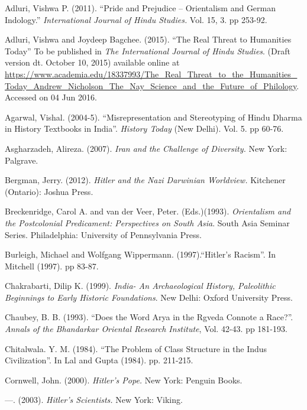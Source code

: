 \begin{thebibliography}{99}
\itemsep=1pt
 Adluri, Vishwa P. (2011). “Pride and Prejudice – Orientalism and German Indology.” \textit{International Journal of Hindu Studies.} Vol. 15, 3. pp 253-92.

  Adluri, Vishwa and Joydeep Bagchee. (2015). “The Real Threat to Humanities Today” To be published in \textit{The International Journal of Hindu Studies}. (Draft version dt. October 10, 2015) available online at \url{https://www.academia.edu/18337993/The_Real_Threat_to_the_Humanities_Today_Andrew_Nicholson_The_Nay_Science_and_the_Future_of_Philology}. Accessed on 04 Jun 2016.

  Agarwal, Vishal. (2004-5). “Misrepresentation and Stereotyping of Hindu Dharma in History Textbooks in India”. \textit{History Today} (New Delhi). Vol. 5. pp 60-76.

  Asgharzadeh, Alireza. (2007). \textit{Iran and the Challenge of Diversity. }New York: Palgrave.

  Bergman, Jerry. (2012). \textit{Hitler and the Nazi Darwinian Worldview.} Kitchener (Ontario): Joshua Press.

  Breckenridge, Carol A. and van der Veer, Peter. (Eds.)(1993). \textit{Orientalism and the Postcolonial Predicament: Perspectives on South Asia}. South Asia Seminar Series. Philadelphia: University of Pennsylvania Press.

  Burleigh, Michael and Wolfgang Wippermann. (1997).“Hitler’s Racism”. In Mitchell (1997). pp 83-87.

  Chakrabarti, Dilip K. (1999). \textit{India- An Archaeological History, Paleolithic Beginnings to Early Historic Foundations}. New Delhi: Oxford University Press.

  Chaubey, B. B. (1993). “Does the Word Arya in the Rgveda Connote a Race?”. \textit{Annals of the Bhandarkar Oriental Research Institute}, Vol. 42-43. pp 181-193.

  Chitalwala. Y. M. (1984). “The Problem of Class Structure in the Indus Civilization”. In Lal and Gupta (1984). pp. 211-215.

  Cornwell, John. (2000). \textit{Hitler’s Pope. }New York: Penguin Books.

  —. (2003). \textit{Hitler’s Scientists.} New York: Viking.


\end{thebibliography}
